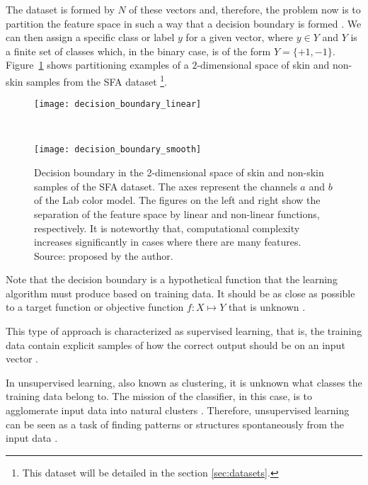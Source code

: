The dataset is formed by $N$ of these vectors and, therefore, the problem now is to partition the feature space in such a way that a decision boundary is formed \citep{duda:12}. We can then assign a specific class or label $y$ for a given vector, where $y \in Y$ and $Y$ is a finite set of classes which, in the binary case, is of the form $Y = \{+1, -1\}$. Figure~\ref{fig:decision_boundary} shows partitioning examples of a $2$-dimensional space of skin and non-skin samples from the SFA dataset \footnote{This dataset will be detailed in the section \ref{sec:datasets}.}.

\begin{figure}[ht]
    \centering
    \begin{minipage}{0.48\textwidth}
        \texttt{[image: decision\_boundary\_linear]}
        \label{fig:decision_boundary_linear}
    \end{minipage}
    ~ %
    \begin{minipage}{0.48\textwidth}
        \texttt{[image: decision\_boundary\_smooth]}
        \label{fig:decision_boundary_smooth}
    \end{minipage}
    \caption[Decision boundary in the 2-dimensional space]{Decision boundary in the 2-dimensional space of skin and non-skin samples of the SFA dataset. The axes represent the channels $a$ and $b$ of the Lab color model. The figures on the left and right show the separation of the feature space by linear and non-linear functions, respectively. It is noteworthy that, computational complexity increases significantly in cases where there are many features. Source: proposed by the author.}
    \label{fig:decision_boundary}
\end{figure}

Note that the decision boundary is a hypothetical function that the learning algorithm must produce based on training data. It should be as close as possible to a target function or objective function $f: X \mapsto Y$ that is unknown \citep{mostafa:12}.

This type of approach is characterized as supervised learning, that is, the training data contain explicit samples of how the correct output should be on an input vector \citep{mostafa:12}.

In unsupervised learning, also known as clustering, it is unknown what classes the training data belong to. The mission of the classifier, in this case, is to agglomerate input data into natural clusters \citep{duda:12}. Therefore, unsupervised learning can be seen as a task of finding patterns or structures spontaneously from the input data \citep{mostafa:12}.

